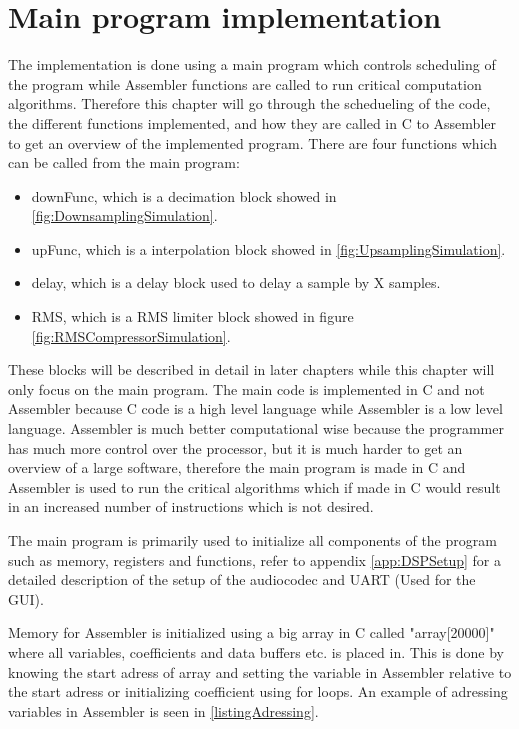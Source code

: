 \chapter{Main program implementation}
The implementation is done using a main program which controls scheduling of the program while Assembler functions are called to run critical computation algorithms. Therefore this chapter will go through the schedueling of the code, the different functions implemented, and how they are called in C to Assembler to get an overview of the implemented program. There are four functions which can be called from the main program:
\begin{itemize}
\item downFunc, which is a decimation block showed in \autoref{fig:DownsamplingSimulation}.
\item upFunc, which is a interpolation block showed in \autoref{fig:UpsamplingSimulation}.
\item delay, which is a delay block used to delay a sample by X samples.
\item RMS, which is a RMS limiter block showed in figure \autoref{fig:RMSCompressorSimulation}. 
\end{itemize}
These blocks will be described in detail in later chapters while this chapter will only focus on the main program. The main code is implemented in C and not Assembler because C code is a high level language while Assembler is a low level language. Assembler is much better computational wise because the programmer has much more control over the processor, but it is much harder to get an overview of a large software, therefore the main program is made in C and Assembler is used to run the critical algorithms which if made in C would result in an increased number of instructions which is not desired. 

The main program is primarily used to initialize all components of the program such as memory, registers and functions, refer to appendix \autoref{app:DSPSetup} for a detailed description of the setup of the audiocodec and UART (Used for the GUI). 

Memory for Assembler is initialized using a big array in C called "array[20000]" where all variables, coefficients and data buffers etc. is placed in. This is done by knowing the start adress of array and setting the variable in Assembler relative to the start adress or initializing coefficient using for loops. An example of adressing variables in Assembler is seen in \autoref{listingAdressing}.

